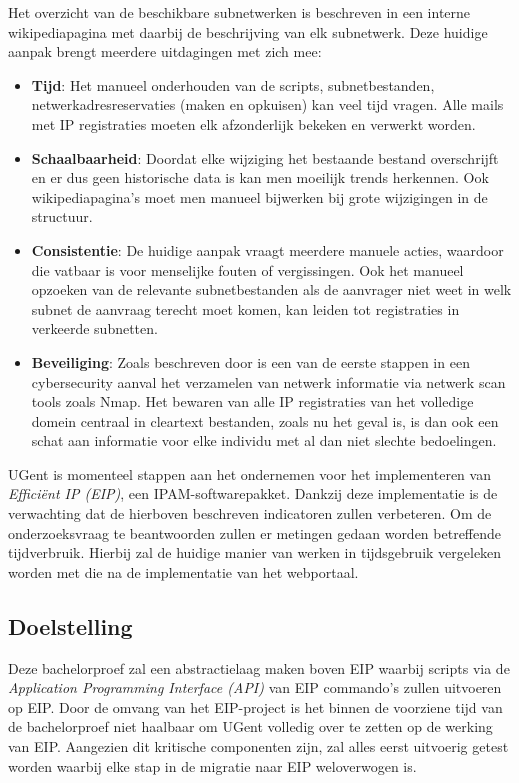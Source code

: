 Het overzicht van de beschikbare subnetwerken is beschreven in een interne wikipediapagina met daarbij de beschrijving van elk subnetwerk. Deze huidige aanpak brengt meerdere uitdagingen met zich mee:
\begin{itemize}
    \item \textbf{Tijd}: Het manueel onderhouden van de scripts, subnetbestanden, netwerkadresreservaties (maken en opkuisen) kan veel tijd vragen. Alle mails met IP registraties moeten elk afzonderlijk bekeken en verwerkt worden.
    \item \textbf{Schaalbaarheid}: Doordat elke wijziging het bestaande bestand overschrijft en er dus geen historische data is kan men moeilijk trends herkennen. Ook wikipediapagina's moet men manueel bijwerken bij grote wijzigingen in de structuur.
    \item \textbf{Consistentie}: De huidige aanpak vraagt meerdere manuele acties, waardoor die vatbaar is voor menselijke fouten of vergissingen. Ook het manueel opzoeken van de relevante subnetbestanden als de aanvrager niet weet in welk subnet de aanvraag terecht moet komen, kan leiden tot registraties in verkeerde subnetten.  
    \item \textbf{Beveiliging}: Zoals beschreven door \textcite{Liao2020} is een van de eerste stappen in een cybersecurity aanval het verzamelen van netwerk informatie via netwerk scan tools zoals Nmap. Het bewaren van alle IP registraties van het volledige domein centraal in cleartext bestanden, zoals nu het geval is, is dan ook een schat aan informatie voor elke individu met al dan niet slechte bedoelingen.
\end{itemize}

UGent is momenteel stappen aan het ondernemen voor het implementeren van \textit{Efficiënt IP (EIP)}, een IPAM-softwarepakket. Dankzij deze implementatie is de verwachting dat de hierboven beschreven indicatoren zullen verbeteren. Om de onderzoeksvraag te beantwoorden zullen er metingen gedaan worden betreffende tijdverbruik. Hierbij zal de huidige manier van werken in tijdsgebruik vergeleken worden met die na de implementatie van het webportaal.

\subsection{Doelstelling}
\label{sec:doelstelling}
Deze bachelorproef zal een abstractielaag maken boven EIP waarbij scripts via de \textit{Application Programming Interface (API)} van EIP commando's zullen uitvoeren op EIP.
Door de omvang van het EIP-project is het binnen de voorziene tijd van de bachelorproef niet haalbaar om UGent volledig over te zetten op de werking van EIP. Aangezien dit kritische componenten zijn, zal alles eerst uitvoerig getest worden waarbij elke stap in de migratie naar EIP weloverwogen is.

